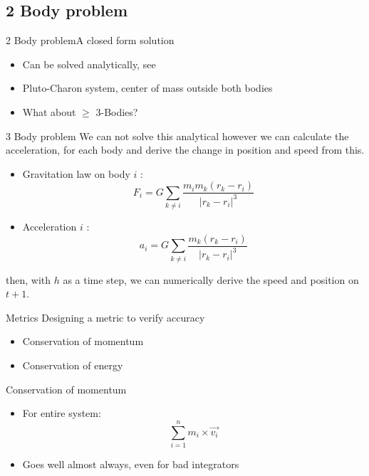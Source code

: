 \documentclass{beamer}
\begin{document}
\subsection{2 Body problem}

\begin{frame}{2 Body problem}{A closed form solution}

  \begin{itemize}
  \item
      Can be solved analytically, see \cite{frida2013}
  \item
      Pluto-Charon system, center of mass outside both bodies
  \item
  	What about $\geq$ 3-Bodies?
  \end{itemize}
\end{frame}

\begin{frame}{3 Body problem}
	We can not solve this analytical however we can calculate the acceleration, for each body and derive the change in position and speed from this.
  \begin{itemize}
    \item 
      Gravitation law on body $i$ : \begin{equation} F_i =G \sum_{k \neq i} \frac{m_im_k(r_k - r_i)}{|r_k - r_i|^3}\end{equation}
    \item 
      Acceleration $i$ : \begin{equation} a_i = G \sum_{k \neq i} \frac{m_k(r_k - r_i)}{|r_k - r_i|^3}\end{equation}
  \end{itemize}
  then, with $h$ as a time step, we can numerically derive the speed and position on $t+1$.
  
\end{frame}

\begin{frame}{Metrics}
Designing a metric to verify accuracy
 \begin{itemize}
	\item
		Conservation of momentum
	\item
		Conservation of energy
 \end{itemize}
\end{frame}

\begin{frame}{Conservation of momentum}
    \begin{itemize}
            \item
                For entire system: \begin{equation} \sum_{i=1}^{n} m_i \times \vec{v_i} \end{equation}
            \item
                Goes well almost always, even for bad integrators
    \end{itemize}
\end{frame}
\end{document}
